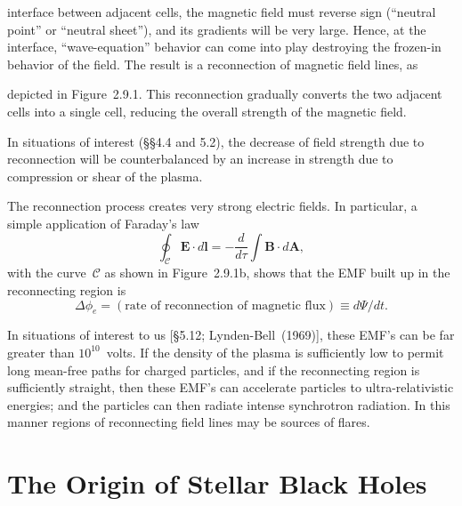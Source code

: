 \noindent
interface between adjacent cells, the magnetic field must reverse sign (``neutral
point'' or ``neutral sheet''), and its gradients will be very large.  Hence, at the
interface, ``wave-equation'' behavior can come into play destroying the frozen-in
behavior of the field.  The result is a reconnection of magnetic field lines, as


\noindent
depicted in Figure~2.9.1.  This reconnection gradually converts the two adjacent
cells into a single cell, reducing the overall strength of the magnetic field.

In situations of interest (\S\S4.4 and 5.2), the decrease of field strength due
to reconnection will be counterbalanced by an increase in strength due to
compression or shear of the plasma.

The reconnection process creates very strong electric fields.  In particular,
a simple application of Faraday's law
%
\begin{equation}
\oint_{\mathscr{C}} \mathbf{E}\cdot d\mathbf{l}
  = -\frac{d}{d\tau}\!\int \mathbf{B}\cdot d\mathbf{A},
\end{equation}
%
with the curve~$\mathscr{C}$ as shown in Figure~2.9.1b, shows that the EMF built up
in the reconnecting region is
%
\begin{equation}
\Delta\phi_e
  = (\text{rate of reconnection of magnetic flux})
  \equiv d\Psi/dt.
\tag{2.9.6}
\end{equation}

In situations of interest to us [\S5.12; Lynden-Bell~(1969)\cite{LyndenBell1969}],
these EMF's can be far greater than $10^{10}$~volts.  If the density of the plasma is
sufficiently low to permit long mean-free paths for charged particles, and if the
reconnecting region is sufficiently straight, then these EMF's can accelerate
particles to ultra-relativistic energies; and the particles can then radiate intense
synchrotron radiation.  In this manner regions of reconnecting field lines may be
sources of flares.


\section{The Origin of Stellar Black Holes}
\label{sec:3}

